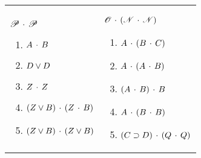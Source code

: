 \begin{exercises}
\begin{longtabu}{p{2.5in}p{2.5in}}

\item $ \mathscr{P} \,\cdot\, \mathscr{P} $ 
\begin{flushleft} 	
\begin{enumerate}[label=\alph*.]
\item 	$A \,\cdot\, B$
\item 	$D \vee D$
\item 	$Z \,\cdot\, Z$
\item 	$(Z \vee B) \,\cdot\, (Z \,\cdot\, B)$
\item 	$(Z \vee B) \,\cdot\, (Z \vee B)$
\end{enumerate}
\end{flushleft}
&
\item $ \mathscr{O} \,\cdot\, (\mathscr{N} \,\cdot\, \mathscr{N}) $ 
\begin{flushleft} 	
\begin{enumerate}[label=\alph*.]
\item 	$A \,\cdot\, (B \,\cdot\, C)$
\item 	$A \,\cdot\, (A \,\cdot\, B)$
\item 	$(A \,\cdot\, B) \,\cdot\, B$
\item 	$A \,\cdot\, (B \,\cdot\, B)$
\item 	$(C\supset D) \,\cdot\, (Q \,\cdot\, Q)$
\end{enumerate}
\end{flushleft}

\end{longtabu}
\end{exercises}
